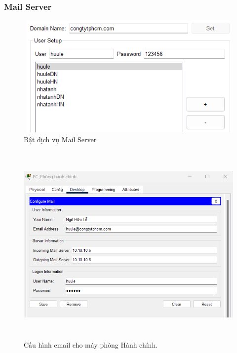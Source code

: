 \documentclass[12pt,a4paper]{report}
\begin{document}
\subsubsection{Mail Server}
\begin{figure}[H]
    \centering
    \includegraphics[width=16cm, height=6cm]{img/Mail_Server1.png}
    \caption{Bật dịch vụ Mail Server}
    \label{hinh422a}
\end{figure}
\begin{figure}[H]
    \centering
    \includegraphics[width=16cm, height=10cm]{img/Mail_Server2.png}
    \caption{Cấu hình email cho máy phòng Hành chính.}
    \label{hinh422b}
\end{figure}
\end{document}
